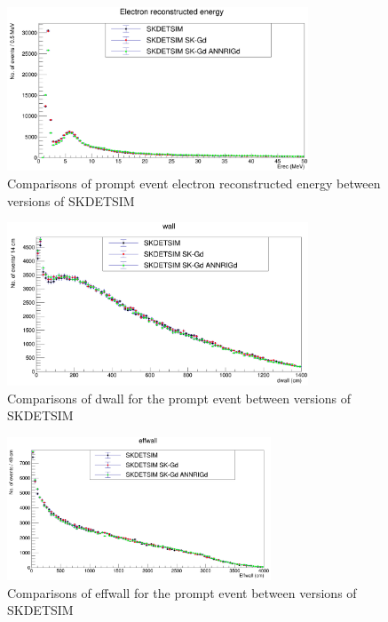 \begin{figure}[htp]
    \centering
    \includegraphics[width=0.8\textwidth]{Figures/erec_compare.png}
    \caption{Comparisons of prompt event electron reconstructed energy between versions of SKDETSIM}
    \label{fig:erec_compare}

\end{figure}

\begin{figure}[htp]
    \centering
    \includegraphics[width=0.8\textwidth]{Figures/dwall_compare.png}
    \caption{Comparisons of dwall for the prompt event between versions of SKDETSIM}
    \label{fig:dwall_compare}

\end{figure}

\begin{figure}[htp]
    \centering
    \includegraphics[width=0.7\textwidth]{Figures/effwall_compare.png}
    \caption{Comparisons of effwall for the prompt event between versions of SKDETSIM}
    \label{fig:effwall_compare}

\end{figure}

